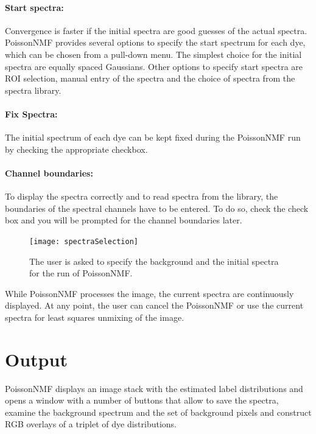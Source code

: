 \documentclass{article}
\begin{document}
\paragraph{Start spectra:}Convergence is faster if the initial spectra are
good guesses of the actual spectra. PoissonNMF provides several options to
specify the start spectrum for each dye, which can be chosen from a
pull-down menu. The simplest choice for the initial spectra are equally spaced
Gaussians. Other options to specify start spectra are ROI selection, manual
entry of the spectra and the choice of spectra from the spectra library.
\paragraph{Fix Spectra:}The initial spectrum of each dye can be kept fixed
during the PoissonNMF run by checking the appropriate checkbox. 
\paragraph{Channel boundaries:}To display the spectra correctly and to read
spectra from the library, the boundaries of the spectral channels have to be
entered. To do so, check the check box and you will be prompted for the channel
boundaries later. 

\begin{figure}[htp]
\begin{center}
  \texttt{[image: spectraSelection]}
  \caption{The user is asked to specify the background and the initial spectra
  for the run of PoissonNMF.}
  \label{fig:spectraSelection}
\end{center}
\end{figure}


While PoissonNMF processes the image, the current spectra are continuously
displayed. At any point, the user can cancel the PoissonNMF or use the current
spectra for least squares unmixing of the image. 


\section*{Output}
PoissonNMF displays an image stack with the estimated label
distributions and opens a window with a number of buttons that allow to save
the spectra, examine the background spectrum and the set of background pixels
and construct RGB overlays of a triplet of dye distributions. 
\end{document}
